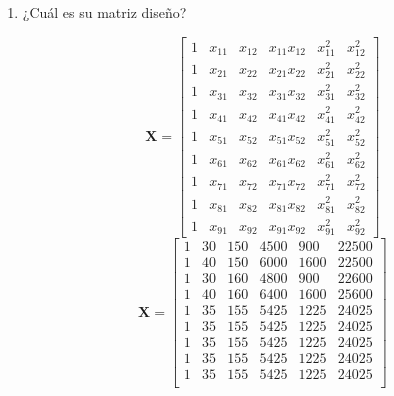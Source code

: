 \documentclass[12pt,a4paper]{report}
\begin{document}
\begin{enumerate}
\begin{enumerate}
Dado que las derivadas son independientes de los parametros se puede concluir que es un modelo lineal.\\

\item ¿Cuál es su matriz diseño?

\begin{equation*}
\textbf{X}=\begin{bmatrix}
1 & x_{11}& x_{12} & x_{11}x_{12} & x_{11}^{2} & x_{12}^{2}\\
1 & x_{21}& x_{22} & x_{21}x_{22} & x_{21}^{2} & x_{22}^{2}\\
1 & x_{31}& x_{32} & x_{31}x_{32} & x_{31}^{2} & x_{32}^{2}\\
1 & x_{41}& x_{42} & x_{41}x_{42} & x_{41}^{2} & x_{42}^{2}\\
1 & x_{51}& x_{52} & x_{51}x_{52} & x_{51}^{2} & x_{52}^{2}\\
1 & x_{61}& x_{62} & x_{61}x_{62} & x_{61}^{2} & x_{62}^{2}\\
1 & x_{71}& x_{72} & x_{71}x_{72} & x_{71}^{2} & x_{72}^{2}\\
1 & x_{81}& x_{82} & x_{81}x_{82} & x_{81}^{2} & x_{82}^{2}\\
1 & x_{91}& x_{92} & x_{91}x_{92} & x_{91}^{2} & x_{92}^{2}
\end{bmatrix}
\end{equation*}
\begin{equation*}
\textbf{X}=\begin{bmatrix}
1 & 30 & 150 & 4500 & 900 & 22500\\
1 & 40 & 150 & 6000 & 1600 & 22500\\
1 & 30 & 160 & 4800 & 900 & 22600\\
1 & 40 & 160 & 6400 & 1600 & 25600\\
1 & 35 & 155 & 5425 & 1225 & 24025\\
1 & 35 & 155 & 5425 & 1225 & 24025\\
1 & 35 & 155 & 5425 & 1225 & 24025\\
1 & 35 & 155 & 5425 & 1225 & 24025\\
1 & 35 & 155 & 5425 & 1225 & 24025\\
\end{bmatrix}
\end{equation*}
\end{enumerate}

\end{enumerate}
\end{document}
